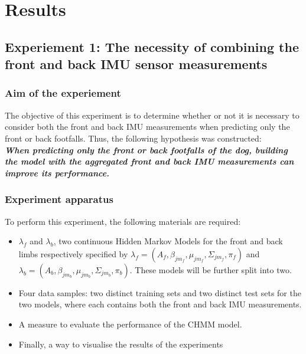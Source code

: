 \chapter{Results}

\section{Experiement 1: The necessity of combining the front and back IMU sensor measurements}

\subsection{Aim of the experiement}
The objective of this experiment is to determine whether or not it is necessary to consider both the front and back IMU measurements when predicting only the front or back footfalls. Thus, the following hypothesis was constructed:\\
\textbf{\textit{When predicting only the front or back footfalls of the dog, building the model with the aggregated front and back IMU measurements can improve its performance.}}

\subsection{Experiment apparatus}
To perform this experiment, the following materials are required:
\begin{itemize}
	\item \(\lambda_f\) and \(\lambda_b\), two continuous Hidden Markov Models for the front and back limbs respectively specified by \(\lambda_f = (A_f, \beta_{jm_f}, \mu_{jm_f}, \Sigma_{jm_f}, \pi_f)\) and \(\lambda_b = (A_b, \beta_{jm_b}, \mu_{jm_b}, \Sigma_{jm_b}, \pi_b)\). These models will be further split into two.
	\item Four data samples: two distinct training sets and two distinct test sets for the two models, where each contains both the front and back IMU measurements.
	\item A measure to evaluate the performance of the CHMM model.
	\item Finally, a way to visualise the results of the experiments
\end{itemize}

